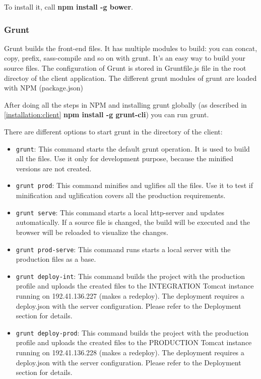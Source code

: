 To install it, call \textbf{npm install -g bower}.

\subsubsection{Grunt}
\label{dev:grunt}
Grunt builds the front-end files. It has multiple modules to build: you can concat, copy, prefix, sass-compile and so on with grunt. It’s an easy way to build your source files. The configuration of Grunt is stored in Gruntfile.js file in the root directoy of the client application. The different grunt modules of grunt are loaded with NPM (package.json)\par

After doing all the steps in NPM and installing grunt globally (as described in \ref{installation:client} \textbf{npm install -g grunt-cli}) you can run grunt.\par
There are different options to start grunt in the directory of the client:
\begin{itemize}
	\item \texttt{grunt}: This command starts the default grunt operation. It is used to build all the files. Use it only for development purpose, because the minified versions are not created.
	\item \texttt{grunt prod}: This command minifies and uglifies all the files. Use it to test if minification and uglification covers all the production requirements.
	\item \texttt{grunt serve}: This command starts a local http-server and updates automatically. If a source file is changed, the build will be executed and the browser will be reloaded to visualize the changes.
	\item \texttt{grunt prod-serve}: This command runs starts a local server with the production files as a base.
	\item \texttt{grunt deploy-int}: This command builds the project with the production profile and uploads the created files to the INTEGRATION Tomcat instance running on 192.41.136.227 (makes a redeploy). The deployment requires a deploy.json with the server configuration. Please refer to the Deployment section for details.
	\item \texttt{grunt deploy-prod}: This command builds the project with the production profile and uploads the created files to the PRODUCTION Tomcat instance running on 192.41.136.228 (makes a redeploy). The deployment requires a deploy.json with the server configuration. Please refer to the Deployment section for details.
\end{itemize}

